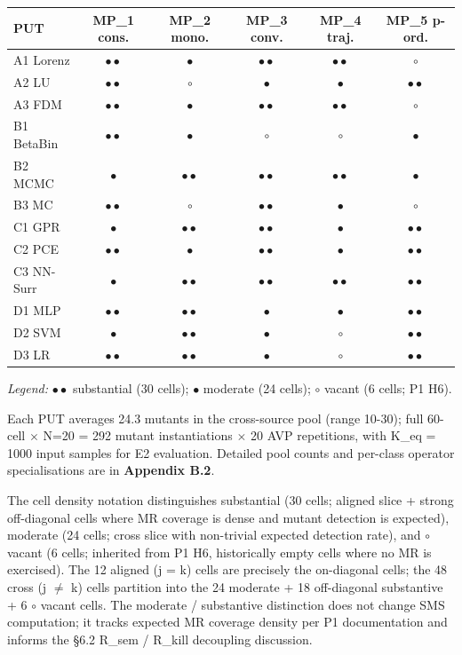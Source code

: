 \documentclass[review,12pt,authoryear]{elsarticle}
\begin{document}
{\def\LTcaptype{table}
\begin{longtable}[]{@{}lccccc@{}}
\toprule\noalign{}
PUT & MP\_1 cons. & MP\_2 mono. & MP\_3 conv. & MP\_4 traj. & MP\_5 p-ord. \\
\midrule\noalign{}
\endhead
\bottomrule\noalign{}
\endlastfoot
A1 Lorenz  & $\bullet\bullet$ & $\bullet$ & $\bullet\bullet$ & $\bullet\bullet$ & $\circ$ \\
A2 LU      & $\bullet\bullet$ & $\circ$ & $\bullet$ & $\bullet$ & $\bullet\bullet$ \\
A3 FDM     & $\bullet\bullet$ & $\bullet$ & $\bullet\bullet$ & $\bullet\bullet$ & $\circ$ \\
B1 BetaBin & $\bullet\bullet$ & $\bullet$ & $\circ$ & $\circ$ & $\bullet$ \\
B2 MCMC    & $\bullet$ & $\bullet\bullet$ & $\bullet\bullet$ & $\bullet\bullet$ & $\bullet$ \\
B3 MC      & $\bullet\bullet$ & $\circ$ & $\bullet\bullet$ & $\bullet$ & $\circ$ \\
C1 GPR     & $\bullet$ & $\bullet\bullet$ & $\bullet\bullet$ & $\bullet$ & $\bullet\bullet$ \\
C2 PCE     & $\bullet\bullet$ & $\bullet$ & $\bullet\bullet$ & $\bullet$ & $\bullet\bullet$ \\
C3 NN-Surr & $\bullet$ & $\bullet\bullet$ & $\bullet\bullet$ & $\bullet\bullet$ & $\bullet\bullet$ \\
D1 MLP     & $\bullet\bullet$ & $\bullet\bullet$ & $\bullet$ & $\bullet$ & $\bullet\bullet$ \\
D2 SVM     & $\bullet$ & $\bullet\bullet$ & $\bullet$ & $\circ$ & $\bullet\bullet$ \\
D3 LR      & $\bullet\bullet$ & $\bullet\bullet$ & $\bullet$ & $\circ$ & $\bullet\bullet$ \\
\end{longtable}
}

\noindent\emph{Legend:} $\bullet\bullet$ substantial (30 cells); $\bullet$ moderate (24 cells); $\circ$ vacant (6 cells; P1 H6).

Each PUT averages 24.3 mutants in the cross-source pool (range
10-30); full 60-cell $\times$ N=20 = 292 mutant instantiations $\times$ 20 AVP
repetitions, with K\_eq = 1000 input samples for E2 evaluation. Detailed
pool counts and per-class operator specialisations are in
\textbf{Appendix B.2}.

The cell density notation distinguishes \textbullet\textbullet substantial (30 cells;
aligned slice + strong off-diagonal cells where MR coverage is dense and
mutant detection is expected), \textbullet moderate (24 cells; cross slice with
non-trivial expected detection rate), and $\circ$ vacant (6 cells; inherited
from P1 H6, historically empty cells where no MR is exercised). The 12
aligned (j = k) cells are precisely the on-diagonal cells; the 48 cross
(j $\neq$ k) cells partition into the 24 \textbullet moderate + 18 \textbullet\textbullet off-diagonal
substantive + 6 $\circ$ vacant cells. The \textbullet moderate / \textbullet\textbullet substantive
distinction does not change SMS computation; it tracks expected MR
coverage density per P1 documentation and informs the §6.2 R\_sem /
R\_kill decoupling discussion.
\end{document}
